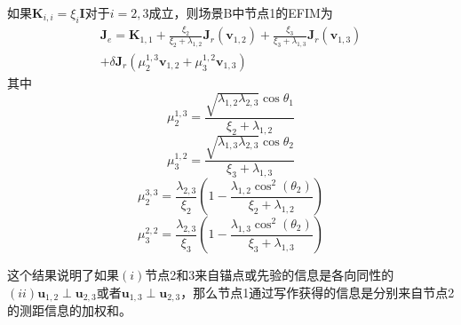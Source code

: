 \begin{corollary}
如果$\bm{K}_{i,i}=\xi_i\bm{I}$对于$i=2,3$成立，则场景B中节点1的EFIM为
\begin{equation*}
\begin{split}
\bm{J}_e=\bm{K}_{1,1}+\frac{\xi_2}{\xi_2+\lambda_{1,2}}\bm{J}_r(\bm{v}_{1,2})+\frac{\xi_3}{\xi_3+\lambda_{1,3}}\bm{J}_r(\bm{v}_{1,3})\\
+\delta\bm{J}_r(\mu_2^{1,3}\bm{v}_{1,2}+\mu_3^{1,2}\bm{v}_{1,3})
\end{split}
\end{equation*}
其中
\[
\mu_2^{1,3}=\frac{\sqrt{\lambda_{1,2}\lambda_{2,3}}\cos \theta_1}{\xi_2+\lambda_{1,2}}
\]
\[
\mu_3^{1,2}=\frac{\sqrt{\lambda_{1,3}\lambda_{2,3}}\cos \theta_2}{\xi_3+\lambda_{1,3}}
\]
\[
\mu_2^{3,3}=\frac{\lambda_{2,3}}{\xi_2}(1-\frac{\lambda_{1,2}\cos^2 (\theta_2)}{\xi_2+\lambda_{1,2}})
\]
\[
\mu_3^{2,2}=\frac{\lambda_{2,3}}{\xi_3}(1-\frac{\lambda_{1,3}\cos^2 (\theta_2)}{\xi_3+\lambda_{1,3}})
\]
\end{corollary}
\begin{remark}
这个结果说明了如果$(i)$节点2和3来自锚点或先验的信息是各向同性的$(ii)\bm{u}_{1,2}\perp\bm{u}_{2,3}$或者$\bm{u}_{1,3}\perp\bm{u}_{2,3}$，那么节点1通过写作获得的信息是分别来自节点2的测距信息的加权和。
\end{remark}
